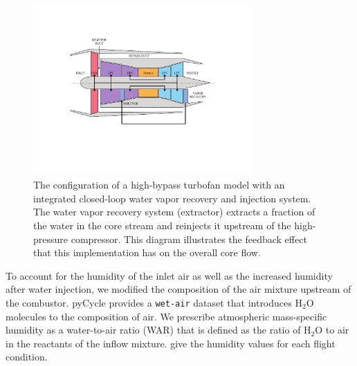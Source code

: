 \documentclass[conf]{new-aiaa}
\begin{document}
\begin{figure}[hbt!]
    \centering
    \includegraphics[width=0.75\textwidth]{turbofan_wvr.pdf}
    \caption{
        The configuration of a high-bypass turbofan model with an integrated closed-loop water vapor recovery and injection system.
        The water vapor recovery system (extractor) extracts a fraction of the water in the core stream and reinjects it upstream of the high-pressure compressor.
        This diagram illustrates the feedback effect that this implementation has on the overall core flow.}
    \label{fig:n3_cycle}
\end{figure}

To account for the humidity of the inlet air as well as the increased humidity after water injection, we modified the composition of the air mixture upstream of the combustor.
pyCycle provides a \texttt{wet-air} dataset that introduces $\mathrm{H_2O}$ molecules to the composition of air.
We prescribe atmospheric mass-specific humidity as a water-to-air ratio (WAR) that is defined as the ratio of $\mathrm{H_2O}$ to air in the reactants of the inflow mixture.
\citet{Kalnay1996} give the humidity values for each flight condition.
\end{document}
